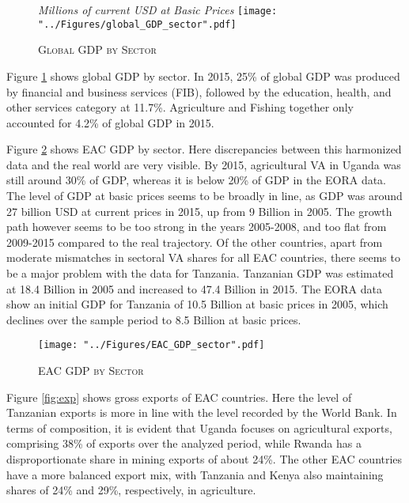 \documentclass[a4paper]{article}
\begin{document}
\begin{figure}[h!] \vspace{-5mm}
\centering
\caption{\label{fig:wld_GDP_sec}\textsc{Global GDP by Sector}}
\small{\textit{Millions of current USD at Basic Prices}}
\texttt{[image: "../Figures/global\_GDP\_sector".pdf]} %
\vspace{-20mm}
\end{figure}
\FloatBarrier
\newpage

Figure \ref{fig:wld_GDP_sec} shows global GDP by sector. In 2015, 25\% of global GDP was produced by financial and business services (FIB), followed by the education, health, and other services category at 11.7\%. Agriculture and Fishing together only accounted for 4.2\% of global GDP in 2015. \newline

Figure \ref{fig:EAC_GDP_sec} shows EAC GDP by sector. Here discrepancies between this harmonized data and the real world are very visible. By 2015, agricultural VA in Uganda was still around 30\% of GDP, whereas it is below 20\% of GDP in the EORA data. The level of GDP at basic prices seems to be broadly in line, as GDP was around 27 billion USD at current prices in 2015, up from 9 Billion in 2005. The growth path however seems to be too strong in the years 2005-2008, and too flat from 2009-2015 compared to the real trajectory. Of the other countries, apart from moderate mismatches in sectoral VA shares for all EAC countries, there seems to be a major problem with the data for Tanzania. Tanzanian GDP was estimated at 18.4 Billion in 2005 and increased to 47.4 Billion in 2015. The EORA data show an initial GDP for Tanzania of 10.5 Billion at basic prices in 2005, which declines over the sample period to 8.5 Billion at basic prices. \newline

\begin{figure}[h!]
\centering
\caption{\label{fig:EAC_GDP_sec}\textsc{EAC GDP by Sector}}
\texttt{[image: "../Figures/EAC\_GDP\_sector".pdf]} %
\end{figure}
\FloatBarrier

Figure \ref{fig:exp} shows gross exports of EAC countries. Here the level of Tanzanian exports is more in line with the level recorded by the World Bank. In terms of composition, it is evident that Uganda focuses on agricultural exports, comprising 38\% of exports over the analyzed period, while Rwanda has a disproportionate share in mining exports of about 24\%. The other EAC countries have a more balanced export mix, with Tanzania and Kenya also maintaining shares of 24\% and 29\%, respectively, in agriculture. 
\end{document}
